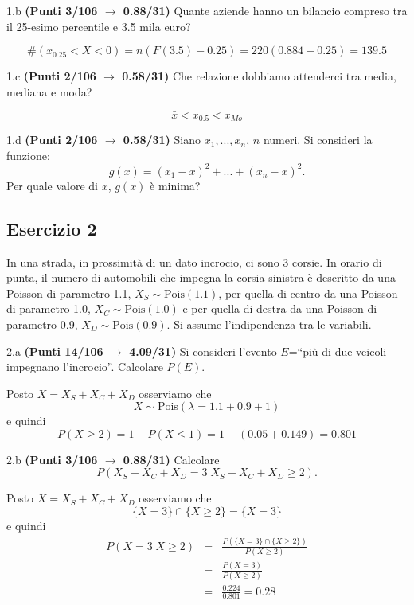 \documentclass[
  11pt,
]{book}
\theoremstyle{mytheoremstyle}
\theoremstyle{mydefstyle}
\newenvironment{sol}
  {
  \begin{tcolorbox}[enhanced,breakable,arc=0.1mm,boxrule=1pt,colback=white,colframe=iblue,
  title=\bf \fontfamily{lmss}\selectfont \hspace{.5 cm} Soluzione,drop fuzzy shadow]

}{
\end{tcolorbox}
  }
\begin{document}
1.b \textbf{(Punti 3/106 \(\rightarrow\) 0.88/31)} Quante aziende hanno un bilancio compreso tra il 25-esimo
percentile e 3.5 mila euro?

\begin{sol}
\[\#(x_{0.25}<X<0)=n(F(3.5)-0.25)=220(0.884-0.25)=139.5\]

\end{sol}

1.c \textbf{(Punti 2/106 \(\rightarrow\) 0.58/31)} Che relazione dobbiamo attenderci tra media, mediana e moda?

\begin{sol}
\[\bar x<x_{0.5}<x_{Mo}\]

\end{sol}

1.d \textbf{(Punti 2/106 \(\rightarrow\) 0.58/31)} Siano \(x_1,...,x_n\), \(n\) numeri. Si consideri la funzione:
\[g(x)=(x_1-x)^2+...+(x_n-x)^2.\]
Per quale valore di \(x\), \(g(x)\) è minima?

\subsection{Esercizio 2}\label{esercizio-2-18}

In una strada, in prossimità di un dato incrocio, ci sono 3 corsie.
In orario di punta, il numero di automobili che impegna la corsia sinistra è descritto
da una Poisson di parametro 1.1, \(X_S\sim\text{Pois}(1.1)\), per quella di centro da una Poisson di parametro 1.0, \(X_C\sim\text{Pois}(1.0)\) e per quella di destra da una Poisson di parametro 0.9, \(X_D\sim\text{Pois}(0.9)\). Si assume l'indipendenza tra le variabili.

2.a \textbf{(Punti 14/106 \(\rightarrow\) 4.09/31)} Si consideri l'evento \(E\)=``più di due veicoli
impegnano l'incrocio''. Calcolare \(P(E)\).

\begin{sol}
Posto \(X=X_S+X_C+X_D\) osserviamo che
\[X\sim\text{Pois}(\lambda=1.1+0.9+1)\]
e quindi
\[P(X\ge 2)=1-P(X\le 1)=1-(0.05+0.149)=0.801\]

\end{sol}

2.b \textbf{(Punti 3/106 \(\rightarrow\) 0.88/31)} Calcolare
\[
P(X_S+X_C+X_D=3|X_S+X_C+X_D\ge 2).
\]

\begin{sol}
Posto \(X=X_S+X_C+X_D\) osserviamo che
\[\{X=3\}\cap\{X \ge 2\}=\{X=3\}\]
e quindi
\begin{eqnarray*}
  P(X=3|X\ge 2) &=&  \frac{P(\{X=3\}\cap\{X \ge 2\})}{P(X \ge 2)}\\
  &=&\frac{P(X=3)}{P(X \ge 2)}\\
  &=&\frac{0.224}{0.801}=0.28\\
\end{eqnarray*}

\end{sol}
\end{document}

